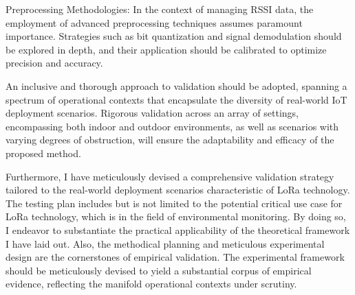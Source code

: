 Preprocessing Methodologies: In the context of managing RSSI data, the employment of advanced preprocessing techniques assumes paramount importance. Strategies such as bit quantization and signal demodulation should be explored in depth, and their application should be calibrated to optimize precision and accuracy.

An inclusive and thorough approach to validation should be adopted, spanning a spectrum of operational contexts that encapsulate the diversity of real-world IoT deployment scenarios. Rigorous validation across an array of settings, encompassing both indoor and outdoor environments, as well as scenarios with varying degrees of obstruction, will ensure the adaptability and efficacy of the proposed method.

Furthermore, I have meticulously devised a comprehensive validation strategy tailored to the real-world deployment scenarios characteristic of LoRa technology. The testing plan includes but is not limited to the potential critical use case for LoRa technology, which is in the field of environmental monitoring. By doing so, I endeavor to substantiate the practical applicability of the theoretical framework I have laid out. Also, the methodical planning and meticulous experimental design are the cornerstones of empirical validation. The experimental framework should be meticulously devised to yield a substantial corpus of empirical evidence, reflecting the manifold operational contexts under scrutiny.
